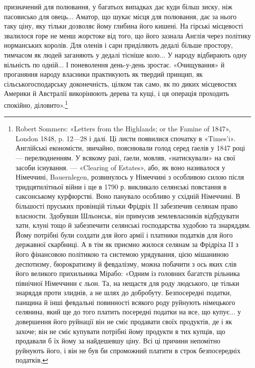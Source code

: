 \parcont{}  %
призначений для полювання, у багатьох випадках дає куди
більш зиску, ніж пасовисько для овець... Аматор, що шукає
місця для полювання, дає за нього таку ціну, яку тільки дозволяє
йому глибина його кишені. На гірські місцевості звалилося горе
не менш жорстоке від того, що його зазнала Англія через політику
норманських королів. Для оленів і сарн приділяють дедалі
більше простору, тимчасом як людей заганяють у дедалі тісніше
коло... У народу відбирають одну вільність по одній... І поневолення
день-у-день зростає. «Очищування» й проганяння
народу власники практикують як твердий принцип, як сільськогосподарську
доконечність, цілком так само, як по диких місцевостях
Америки й Австралії викорінюють дерева та кущі, і ця
операція проходить спокійно, діловито».\footnote{
Robert Sommers: «Letters from the Highlands; or the Famine
of 1847», London 1848, p. 12—28 і далі. Ці листи появилися спочатку
в «Times’i». Англійські економісти, звичайно, пояснювали голод серед
ґаелів у 1847 році — перелюдненням. У всякому разі, ґаели, мовляв,
«натискували» на свої засоби існування. — «Clearing of Estates», або,
як воно називалося у Німеччині, Bauernlegen, розвинулось у Німеччині
з особливою силою після тридцятилітньої війни і ще в 1790 р. викликало
селянські повстання в саксонському курфюрстві. Воно панувало особливо
у східній Німеччині. В більшості пруських провінцій тільки Фрідріх II
забезпечив селянам право власности. Здобувши Шльонськ, він примусив
землевласників відбудувати хати, клуні тощо й забезпечити селянські
господарства худобою та знаряддям. Йому потрібні були солдати для
його армії і платники податків для його державної скарбниці. А в тім
як приємно жилося селянам за Фрідріха II з його фінансовою політикою
та системою урядування, цією мішаниною деспотизму, бюрократизму
й февдалізму, можна побачити з ось яких слів його великого прихильника
Мірабо: «Одним із головних багатств рільника північної Німеччини
є льон. Та, на нещастя для роду людського, це тільки знаряддя проти
злиднів, а не шлях до добробуту. Безпосередні податки, панщина й інші
февдальні повинності всякого роду руйнують німецького селянина, який
ще до того платить посередні податки на все, що купує... у довершення
його руйнації він не сміє продавати своїх продуктів, де і як захоче; він
не сміє купувати потрібні йому продукти в тих купців, що продавали б
їх йому за найдешевшу ціну. Всі ці причини непомітно руйнують його,
і він не був би спроможний платити в строк безпосередніх податків,
}
